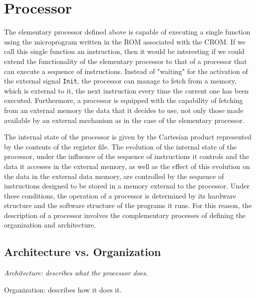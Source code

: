 \section{Processor}\label{toyRISCprocessor}

The elementary processor defined above is capable of executing a single function using the microprogram written in the ROM associated with the CROM. If we call this single function an instruction, then it would be interesting if we could extend the functionality of the elementary processor to that of a processor that can execute a sequence of instructions. Instead of "waiting" for the activation of the external signal {\tt Init}, the processor can manage to fetch from a memory, which is external to it, the next instruction every time the current one has been executed. Furthermore, a processor is equipped with the capability of fetching from an external memory the data that it decides to use, not only those made available by an external mechanism as in the case of the elementary processor.

The internal state of the processor is given by the Cartesian product represented by the contents of the register file. The evolution of the internal state of the processor, under the influence of the sequence of instructions it controls and the data it accesses in the external memory, as well as the effect of this evolution on the data in the external data memory, are controlled by the sequence of instructions designed to be stored in a memory external to the processor. Under these conditions, the operation of a processor is determined by its hardware structure and the software structure of the programs it runs. For this reason, the description of a processor involves the complementary processes of defining the organization and architecture.

\subsection{Architecture vs. Organization}\label{archOrg}

{\small
 \hfill{
\begin{minipage}{8cm}
{\em Architecture: describes what the processor does.

Organization: describes how it does it.}
\end{minipage}
}}

